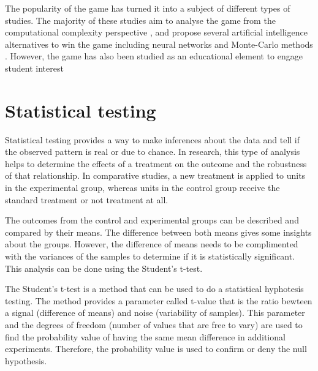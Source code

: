 The popularity of the game has turned it into a subject of different types of studies. The majority of these studies aim to analyse the game from the computational complexity perspective \citep{abdelkader20162048}, and propose several artificial intelligence alternatives to win the game including neural networks \citep{boris2016evolving} and Monte-Carlo methods \citep{rodgers2014investigation}. However, the game has also been studied as an educational element to engage student interest \citep{neller2015pedagogical}

\section{Statistical testing}
\label{stat-testing}
Statistical testing provides a way to make inferences about the data and tell if the observed pattern is real or due to chance. In research, this type of analysis helps to determine the effects of a treatment on the outcome and the robustness of that relationship. In comparative studies, a new treatment is applied to units in the experimental group, whereas units in the control group receive the standard treatment or not treatment at all.

The outcomes from the control and experimental groups can be described and compared by their means. The difference between both means gives some insights about the groups. However, the difference of means needs to be complimented with the variances of the samples to determine if it is statistically significant. This analysis can be done using the Student's t-test.

The Student's t-test is a method that can be used to do a statistical hyphotesis testing. The method provides a parameter called t-value that is the ratio bewteen a signal (difference of means) and noise (variability of samples). This parameter and the degrees of freedom (number of values that are free to vary) are used to find the probability value of having the same mean difference in additional experiments. Therefore, the probability value is used to confirm or deny the null hypothesis.


